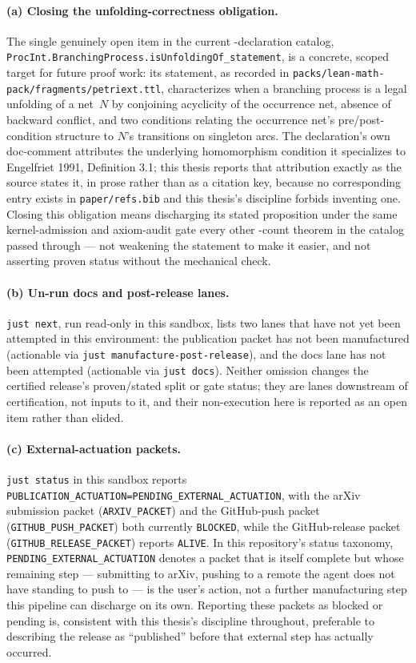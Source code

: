 \paragraph{(a) Closing the unfolding-correctness obligation.}
The single genuinely open item in the current \TotalDecls-declaration
catalog, \texttt{ProcInt.BranchingProcess.isUnfoldingOf\_statement}, is a
concrete, scoped target for future proof work: its statement, as recorded
in \texttt{packs/lean-math-pack/fragments/petriext.ttl}, characterizes
when a branching process is a legal unfolding of a net~$N$ by conjoining
acyclicity of the occurrence net, absence of backward conflict, and two
conditions relating the occurrence net's pre/post-condition structure to
$N$'s transitions on singleton arcs. The declaration's own doc-comment
attributes the underlying homomorphism condition it specializes to
Engelfriet 1991, Definition 3.1; this thesis reports that attribution
exactly as the source states it, in prose rather than as a citation
key, because no corresponding entry exists in \texttt{paper/refs.bib} and
this thesis's discipline forbids inventing one. Closing this obligation
means discharging its stated proposition under the same kernel-admission
and axiom-audit gate every other \KernelTheorems-count theorem in the
catalog passed through --- not weakening the statement to make it easier,
and not asserting proven status without the mechanical check.

\paragraph{(b) Un-run docs and post-release lanes.}
\texttt{just next}, run read-only in this sandbox, lists two lanes that
have not yet been attempted in this environment: the publication packet
has not been manufactured (actionable via \texttt{just manufacture-post-release}),
and the docs lane has not been attempted (actionable via \texttt{just docs}).
Neither omission changes the certified release's proven/stated split or
gate status; they are lanes downstream of certification, not inputs to
it, and their non-execution here is reported as an open item rather than
elided.

\paragraph{(c) External-actuation packets.}
\texttt{just status} in this sandbox reports \texttt{PUBLICATION\_ACTUATION=PENDING\_EXTERNAL\_ACTUATION},
with the arXiv submission packet (\texttt{ARXIV\_PACKET}) and the
GitHub-push packet (\texttt{GITHUB\_PUSH\_PACKET}) both currently
\texttt{BLOCKED}, while the GitHub-release packet
(\texttt{GITHUB\_RELEASE\_PACKET}) reports \texttt{ALIVE}. In this
repository's status taxonomy, \texttt{PENDING\_EXTERNAL\_ACTUATION}
denotes a packet that is itself complete but whose remaining step ---
submitting to arXiv, pushing to a remote the agent does not have
standing to push to --- is the user's action, not a further manufacturing
step this pipeline can discharge on its own. Reporting these packets as
blocked or pending is, consistent with this thesis's discipline
throughout, preferable to describing the release as ``published'' before
that external step has actually occurred.

